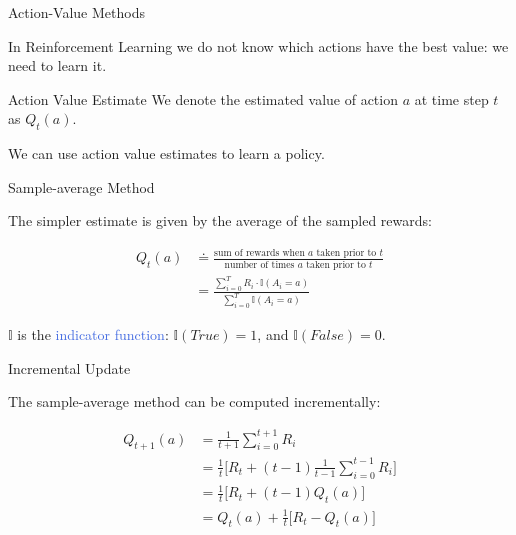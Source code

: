 \documentclass{beamer}
\begin{document}
\begin{frame}{Action-Value Methods}

In Reinforcement Learning we do not know which actions have the best value: we need to learn it.

\vspace{2mm}

\begin{block}{Action Value Estimate}		
We denote the estimated value of action $a$ at time step $t$ as $Q_t(a)$.
\end{block}

\vspace{2mm}

We can use action value estimates to learn a policy.

\end{frame}

\begin{frame}{Sample-average Method}

The simpler estimate is given by the average of the sampled rewards:

\begin{align*}
	Q_t(a) &\doteq \frac{\text{sum of rewards when $a$ taken prior to $t$}}{\text{number of times $a$ taken prior to $t$} }\\
	   & = \frac{\sum_{i=0}^{T} R_i \cdot \mathds I(A_i = a)}{\sum_{i=0}^{T} \mathds I(A_i = a)}
\end{align*}

$\mathds I$ is the \textcolor{RoyalBlue}{indicator function}: $\mathds I(True) = 1$, and $\mathds I(False) = 0$.
 
\end{frame}


\begin{frame}{Incremental Update}

The sample-average method can be computed incrementally:

\begin{align*}
	Q_{t+1}(a) &= \frac{1}{t+1} \sum_{i=0}^{t+1} R_i \\
	           &= \frac{1}{t} \bigg[ R_t + (t-1)\frac{1}{t-1}\sum_{i=0}^{t-1} R_i \bigg]\\
	           &= \frac{1}{t} \bigg[ R_t + (t-1) Q_t(a) \bigg ]\\
	           &= Q_t(a) + \frac{1}{t}  \bigg[ R_t - Q_t(a)  \bigg ]
\end{align*}


\end{frame}
\end{document}
